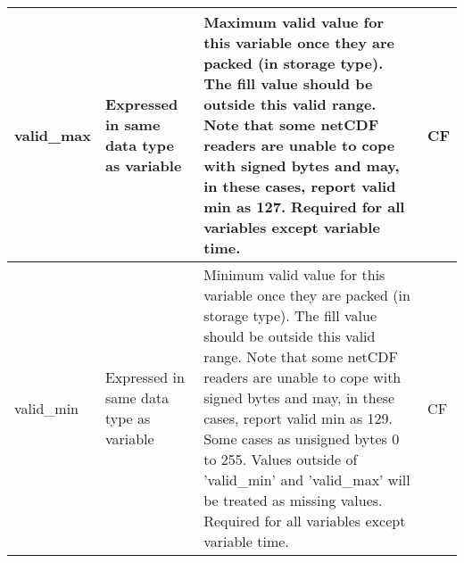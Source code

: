 \begin{longtable}{|p{}|p{}|p{}|p{}|}
\rowcolor{violet!25}
valid\_max & Expressed in same data type as variable & Maximum valid value for this variable once they are packed (in storage type). The fill value should be outside this valid range. Note that some netCDF readers are unable to cope with signed bytes and may, in these cases, report valid min as 127. Required for all variables except variable time. & CF \\ \hline
\rowcolor{violet!25}
valid\_min & Expressed in same data type as variable & Minimum valid value for this variable once they are packed (in storage type). The fill value should be outside this valid range. Note that some netCDF readers are unable to cope with signed bytes and may, in these cases, report valid min as 129. Some cases as unsigned bytes 0 to 255. Values outside of 'valid\_min' and 'valid\_max' will be treated as missing values. Required for all variables except variable time. & CF \\ \hline
\end{longtable}
